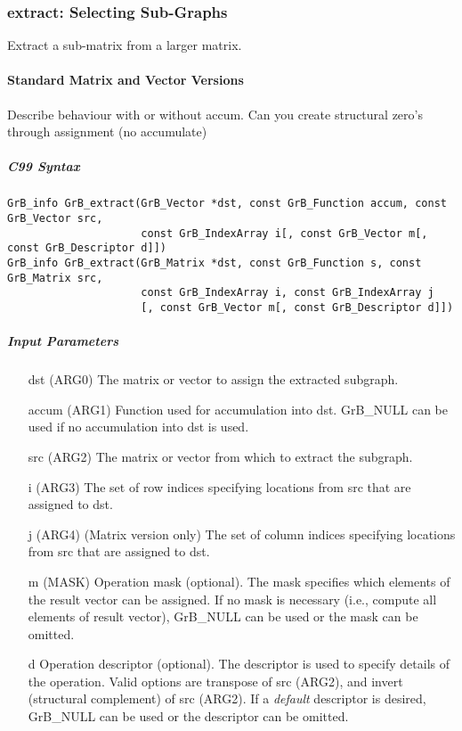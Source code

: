 \subsubsection{{\sf extract}: Selecting Sub-Graphs}

Extract a sub-matrix from a larger matrix. 

\paragraph{Standard Matrix and Vector Versions}

Describe behaviour with or without accum.  Can you create structural zero's through assignment (no accumulate)

\subparagraph{C99 Syntax}

\begin{verbatim}
GrB_info GrB_extract(GrB_Vector *dst, const GrB_Function accum, const GrB_Vector src,
                     const GrB_IndexArray i[, const GrB_Vector m[, const GrB_Descriptor d]])
GrB_info GrB_extract(GrB_Matrix *dst, const GrB_Function s, const GrB_Matrix src,
                     const GrB_IndexArray i, const GrB_IndexArray j
                     [, const GrB_Vector m[, const GrB_Descriptor d]])
\end{verbatim}

\subparagraph{Input Parameters}

\begin{itemize}
	\item[{\sf dst}]   ({\sf ARG0}) The matrix or vector to assign the extracted subgraph.
	\item[{\sf accum}] ({\sf ARG1}) Function used for accumulation into dst.  {\sf GrB\_NULL}
                       can be used if no accumulation into dst is used.
	\item[{\sf src}]   ({\sf ARG2}) The matrix or vector from which to extract the subgraph.
	\item[{\sf i}]     ({\sf ARG3}) The set of row indices specifying locations from src that
                       are assigned to dst.
	\item[{\sf j}]     ({\sf ARG4}) (Matrix version only) The set of column indices specifying
                       locations from src that are assigned to dst.

	\item[{\sf m}]     ({\sf MASK}) Operation mask (optional). The mask
	specifies which elements of the result vector can be assigned.
	If no mask is necessary (i.e., compute all elements of result
	vector), {\sf GrB\_NULL} can be used or the mask can be omitted.

	\item[{\sf d}] Operation descriptor (optional). The descriptor
    is used to specify details of the operation. Valid options are transpose
    of src (ARG2), and invert (structural complement) of src (ARG2). If
    a \emph{default} descriptor is desired,	{\sf GrB\_NULL} can be
    used or the descriptor can be omitted.
\end{itemize}

